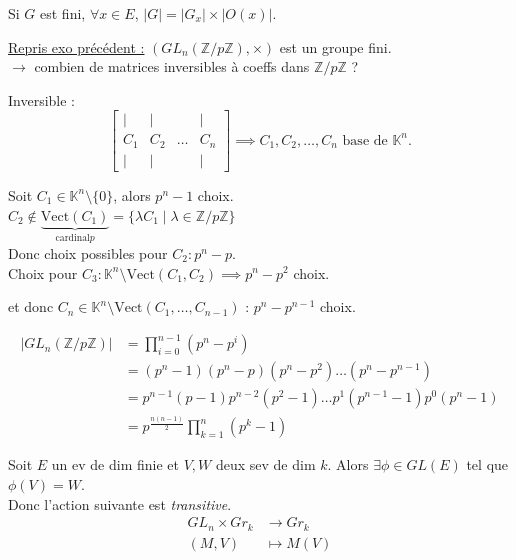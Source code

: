 \begin{corollaire}{}{} Si $G$ est fini, $\forall x \in E$, $|G| = |G_x| \times |O(x)|$.
\end{corollaire}
\vspace{0.5cm}

\noindent \uline{Repris exo précédent :} $(GL_n(\mathbb{Z}/p\mathbb{Z}), \times)$ est un groupe fini. \\
$\to$ combien de matrices inversibles à coeffs dans $\mathbb{Z}/p\mathbb{Z}$ ?

Inversible :
\[
\begin{bmatrix}
    \vert & \vert & & \vert \\
    C_1 & C_2 & \dots & C_n \\
    \vert & \vert & & \vert
\end{bmatrix}
\implies C_1, C_2, \dots, C_n \text{ base de } \mathbb{K}^n.
\]

Soit $C_1 \in \mathbb{K}^n \setminus \{0\}$, alors $p^n - 1$ choix. \\
$C_2 \notin \underbrace{\text{Vect}(C_1)}_{\text{cardinal} p} = \{ \lambda C_1 \mid \lambda \in \mathbb{Z}/p\mathbb{Z} \}$ \\

Donc choix possibles pour $C_2 : p^n - p$. \\
Choix pour $C_3 : \mathbb{K}^n \setminus \text{Vect}(C_1, C_2) \implies p^n - p^2$ choix.

et donc $C_n \in \mathbb{K}^n \setminus \text{Vect}(C_1, \dots, C_{n-1})$ : $p^n - p^{n-1}$ choix.

\vspace{0.5cm}

\begin{theoreme}{}{}
\begin{align}
    |GL_n(\mathbb{Z}/p\mathbb{Z})| & = \prod_{i=0}^{n-1} (p^n - p^i) \\
    & = (p^n - 1)(p^n - p)(p^n - p^2) \dots (p^n - p^{n-1}) \\
    & = p^{n - 1}(p - 1) p^{n - 2}(p^2 - 1) \dots p^1 (p^{n-1} - 1) p^0 (p^n - 1) \\
    & = p^{\frac{n(n - 1)}{2}} \prod_{k=1}^n (p^k - 1)
\end{align}
\end{theoreme}

\vspace{0.8cm}


Soit $E$ un ev de dim finie et $V, W$ deux sev de dim $k$. Alors $\exists \phi \in GL(E)$ tel que $\phi(V) = W$. \\
Donc l'action suivante est \textit{transitive}.
\[
\begin{aligned}
    GL_n \times Gr_k &\to Gr_k \\
    (M, V) &\mapsto M(V)
\end{aligned}
\]

